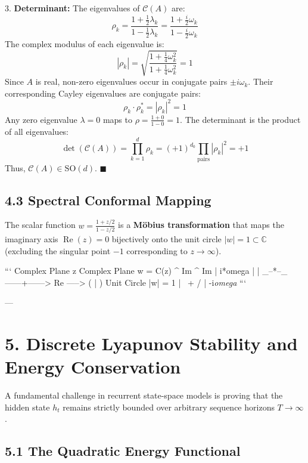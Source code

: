 \documentclass[11pt,twoside,openright]{amsbook}
\begin{document}
{{{{{{3. \textbf{Determinant:}  
   The eigenvalues of $\mathcal{C}(A)$ are:
   $$\rho_k = \frac{1 + \frac{1}{2} \lambda_k}{1 - \frac{1}{2} \lambda_k} = \frac{1 + \frac{i}{2} \omega_k}{1 - \frac{i}{2} \omega_k}$$
   The complex modulus of each eigenvalue is:
   $$|\rho_k| = \sqrt{\frac{1 + \frac{1}{4} \omega_k^2}{1 + \frac{1}{4} \omega_k^2}} = 1$$
   Since $A$ is real, non-zero eigenvalues occur in conjugate pairs $\pm i\omega_k$. Their corresponding Cayley eigenvalues are conjugate pairs:
   $$\rho_k \cdot \rho_k^* = |\rho_k|^2 = 1$$
   Any zero eigenvalue $\lambda = 0$ maps to $\rho = \frac{1+0}{1-0} = 1$. The determinant is the product of all eigenvalues:
   $$\det(\mathcal{C}(A)) = \prod_{k=1}^d \rho_k = (+1)^{d_0} \prod_{\text{pairs}} |\rho_k|^2 = +1$$
   Thus, $\mathcal{C}(A) \in \mathrm{SO}(d)$. $\blacksquare$

\subsection{4.3 Spectral Conformal Mapping}

The scalar function $w = \frac{1 + z/2}{1 - z/2}$ is a \textbf{Möbius transformation} that maps the imaginary axis $\operatorname{Re}(z) = 0$ bijectively onto the unit circle $|w| = 1 \subset \mathbb{C}$ (excluding the singular point $-1$ corresponding to $z \to \infty$).

```
        Complex Plane z                     Complex Plane w = C(z)
              ^ Im                                  ^ Im
              | i*omega                             |
              |                                 _--*--_
        ------+------> Re               -----> (   |   )  Unit Circle |w| = 1
              |                                 \  +  /
              | -i\textit{omega                           }
```

---

\section{5. Discrete Lyapunov Stability and Energy Conservation}

A fundamental challenge in recurrent state-space models is proving that the hidden state $h_t$ remains strictly bounded over arbitrary sequence horizons $T \to \infty$.

\subsection{5.1 The Quadratic Energy Functional}

}}}}}}
\end{document}
